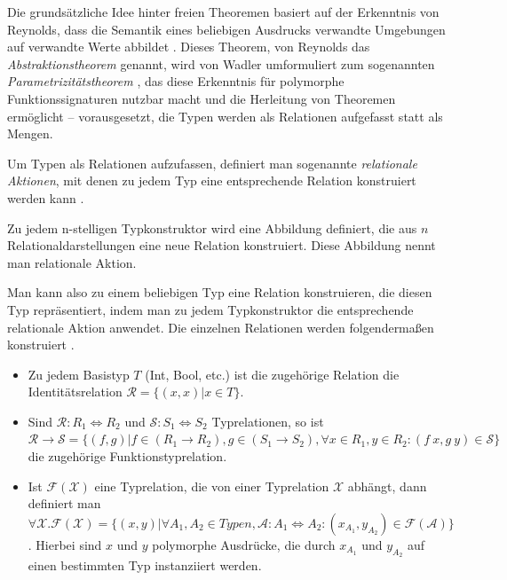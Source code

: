 Die grundsätzliche Idee hinter freien Theoremen basiert auf der Erkenntnis von Reynolds, dass die Semantik eines beliebigen
Ausdrucks verwandte Umgebungen auf verwandte Werte abbildet \cite{reynolds}. Dieses Theorem, von Reynolds das
\textit{Abstraktionstheorem} genannt, wird von Wadler umformuliert zum sogenannten \textit{Parametrizitätstheorem} \cite{wadler},
das diese Erkenntnis für polymorphe Funktionssignaturen nutzbar macht und die Herleitung von Theoremen ermöglicht --
vorausgesetzt, die Typen werden als Relationen aufgefasst statt als Mengen.

Um Typen als Relationen aufzufassen, definiert man sogenannte \textit{relationale Aktionen}, mit denen zu jedem Typ eine entsprechende Relation
konstruiert werden kann \cite{johann2006}.

\begin{mydef}
Zu jedem n-stelligen Typkonstruktor wird eine Abbildung definiert, die aus $n$ Relationaldarstellungen eine neue Relation konstruiert.
Diese Abbildung nennt man relationale Aktion.
\end{mydef}




Man kann also zu einem beliebigen Typ eine Relation konstruieren, die diesen Typ repräsentiert, indem man zu jedem Typkonstruktor
die entsprechende relationale Aktion anwendet. Die einzelnen Relationen werden folgendermaßen konstruiert \cite{voigtlander}.

\begin{itemize}
\item Zu jedem Basistyp $T$ (Int, Bool, etc.) ist die zugehörige Relation die Identitätsrelation $\mathcal{R} = \{ (x, x) | x \in T\}$.
\item Sind $\mathcal{R} : R_1 \Leftrightarrow R_2$ und $\mathcal{S} : S_1 \Leftrightarrow S_2$ Typrelationen, so ist $\mathcal{R} \rightarrow \mathcal{S} = \{ (f, g) | f \in (R_1 \rightarrow R_2), g \in (S_1 \rightarrow S_2), \forall x \in R_1, y \in R_2: (f\ x, g\ y) \in \mathcal{S} \}$ die zugehörige Funktionstyprelation.
\item Ist $\mathcal{F}(\mathcal{X})$ eine Typrelation, die von einer Typrelation $\mathcal{X}$ abhängt, dann definiert man
$\forall \mathcal{X} . \mathcal{F}(\mathcal{X}) = \{ (x, y) | \forall A_1, A_2 \in Typen, \mathcal{A} : A_1 \Leftrightarrow A_2: 
(x_{A_1}, y_{A_2}) \in \mathcal{F}(\mathcal{A}) \}$. Hierbei sind $x$ und $y$ polymorphe Ausdrücke, die durch $x_{A_1}$ und
$y_{A_2}$ auf einen bestimmten Typ instanziiert werden.
\end{itemize}

